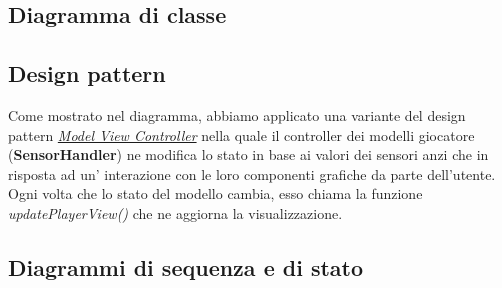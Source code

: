 \documentclass[a4paper,11pt]{article}
\begin{document}
\subsection{Diagramma di classe}
\noindent{}
\subsection{Design pattern}
Come mostrato nel diagramma, abbiamo applicato una variante del design pattern \hyperref[MVC]{\emph{Model View Controller}} nella quale il controller dei modelli giocatore (\textbf{SensorHandler}) ne modifica lo stato in base ai valori dei sensori anzi che in risposta ad un' interazione con le loro componenti grafiche da parte dell'utente. Ogni volta che lo stato del modello cambia, esso chiama la funzione \emph{updatePlayerView()} che ne aggiorna la visualizzazione.
\newpage

\subsection{Diagrammi di sequenza e di stato}
\end{document}
